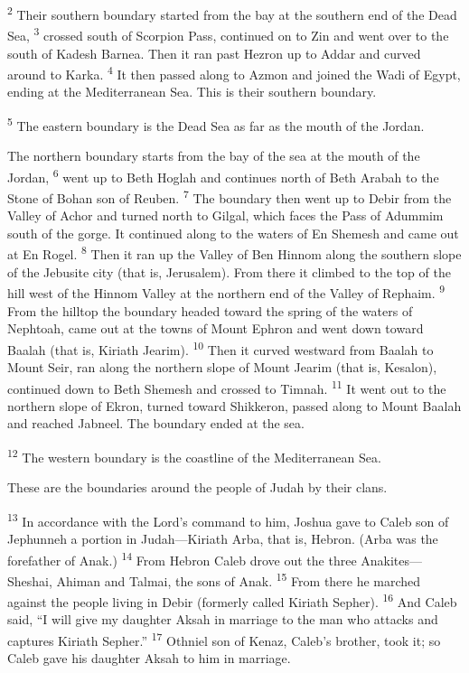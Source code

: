 \documentclass[12pt,twoside]{article}
\newcommand{\vs}[1]{\textsuperscript{#1}}
\begin{document}
\begin{adjustwidth}{0.5cm}{0cm}
  \vs{2} Their southern boundary started from the bay at the southern end of the Dead Sea,
  \vs{3} crossed south of Scorpion Pass, continued on to Zin and went over to the south of Kadesh Barnea. Then it ran past Hezron up to Addar and curved around to Karka.
  \vs{4} It then passed along to Azmon and joined the Wadi of Egypt, ending at the Mediterranean Sea. This is their southern boundary.\vspace{0.3cm}

  \vs{5} The eastern boundary is the Dead Sea as far as the mouth of the Jordan.
  
  The northern boundary starts from the bay of the sea at the mouth of the Jordan,
  \vs{6} went up to Beth Hoglah and continues north of Beth Arabah to the Stone of Bohan son of Reuben.
  \vs{7} The boundary then went up to Debir from the Valley of Achor and turned north to Gilgal, which faces the Pass of Adummim south of the gorge. It continued along to the waters of En Shemesh and came out at En Rogel.
  \vs{8} Then it ran up the Valley of Ben Hinnom along the southern slope of the Jebusite city (that is, Jerusalem). From there it climbed to the top of the hill west of the Hinnom Valley at the northern end of the Valley of Rephaim.
  \vs{9} From the hilltop the boundary headed toward the spring of the waters of Nephtoah, came out at the towns of Mount Ephron and went down toward Baalah (that is, Kiriath Jearim).
  \vs{10} Then it curved westward from Baalah to Mount Seir, ran along the northern slope of Mount Jearim (that is, Kesalon), continued down to Beth Shemesh and crossed to Timnah.
  \vs{11} It went out to the northern slope of Ekron, turned toward Shikkeron, passed along to Mount Baalah and reached Jabneel. The boundary ended at the sea.

  \vs{12} The western boundary is the coastline of the Mediterranean Sea.\vspace{0.3cm}
\end{adjustwidth}

These are the boundaries around the people of Judah by their clans.\vspace{0.4cm}

\vs{13} In accordance with the Lord's command to him, Joshua gave to Caleb son of Jephunneh a portion in Judah---Kiriath Arba, that is, Hebron. (Arba was the forefather of Anak.)
\vs{14} From Hebron Caleb drove out the three Anakites---Sheshai, Ahiman and Talmai, the sons of Anak.
\vs{15} From there he marched against the people living in Debir (formerly called Kiriath Sepher).
\vs{16} And Caleb said, ``I will give my daughter Aksah in marriage to the man who attacks and captures Kiriath Sepher.''
\vs{17} Othniel son of Kenaz, Caleb's brother, took it; so Caleb gave his daughter Aksah to him in marriage.
\end{document}
